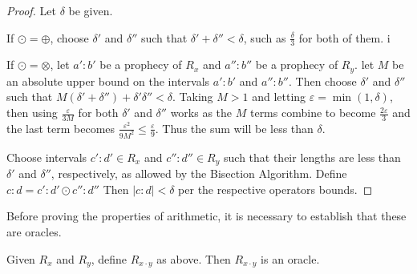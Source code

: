 \begin{proof}
    Let $\delta$ be given. 

    If $\odot = \oplus$, choose $\delta'$ and $\delta''$ such that $\delta' + \delta'' < \delta$, such as $\frac{\delta}{3}$ for both of them. i

    If $\odot = \otimes$, let $a':b'$ be a prophecy of $R_x$ and $a'':b''$ be a prophecy of $R_y$. let $M$ be an absolute upper bound on the intervals $a':b'$ and $a'':b''$. Then choose $\delta'$ and $\delta''$ such that $M (\delta' + \delta'') + \delta' \delta'' < \delta$. Taking $M> 1$ and letting $\varepsilon = \min(1, \delta)$, then using $\frac{\varepsilon}{3M}$ for both $\delta'$ and $\delta''$ works as the $M$ terms combine to become $\frac{2 \varepsilon}{3}$ and the last term becomes $\frac{\varepsilon^2}{9M^2} \leq \frac{\varepsilon}{9}$. Thus the sum will be less than $\delta$.

    Choose intervals $c':d' \in R_x$ and $c'':d'' \in R_y$  such that their lengths are less than $\delta'$ and $\delta''$, respectively, as allowed by the Bisection Algorithm. Define $c:d = c':d' \odot c'':d''$ Then $|c:d| < \delta$ per the respective operators bounds. 

    
    
\end{proof}

Before proving the properties of arithmetic, it is necessary to establish that these are oracles. 

\begin{proposition}
    Given $R_x$ and $R_y$, define $R_{x \cdot y}$ as above. Then $R_{x \cdot y}$ is an oracle. 
\end{proposition}

